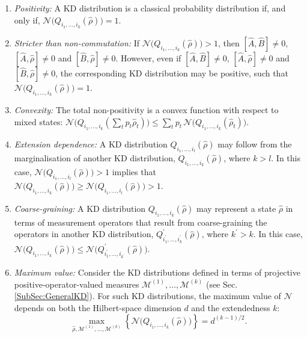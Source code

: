 \documentclass[%
 reprint,
superscriptaddress,
nofootinbib,
bibnotes,
 amsmath,amssymb,
 aps,
]{revtex4-1}
\theoremstyle{plain}
\newcommand{\LParen}{ \bm{(} }
\newcommand{\RParen}{ \bm{)} }
\begin{document}
\begin{enumerate}

\item{ \textit{Positivity:} A KD distribution is a classical probability distribution if, and only if,  $\mathcal{N} \LParen Q_{i_1,\ldots,i_k} (\hat{\rho})  \RParen = 1$.}

\item{ \textit{Stricter than non-commutation:}   If $\mathcal N\LParen Q_{i_1,\ldots,i_k} (\hat{\rho})  \RParen > 1$, then $[\hat{A},\hat{B}] \neq 0$,  $[\hat{A},\hat{\rho}] \neq 0$ and  $[\hat{B},\hat{\rho}] \neq 0$. However, even if $[\hat{A},\hat{B}] \neq 0$,  $[\hat{A},\hat{\rho}] \neq 0$ and  $[\hat{B},\hat{\rho}] \neq 0$, the corresponding KD distribution may be positive, such that $\mathcal N\LParen Q_{i_1,\ldots,i_k} (\hat{\rho})  \RParen = 1$.
}
\item{ \textit{Convexity:} The total non-positivity is a convex function with respect to mixed states: 
$\mathcal{N} \LParen Q_{i_1,\ldots,i_k} \left( \sum_t p_t \hat{\rho}_t \right)  \RParen 
\leq \sum_t p_t \,  \mathcal{N} \LParen Q_{i_1,\ldots,i_k} \left(  \hat{\rho}_t \right)  \RParen $. }

\item{ \textit{Extension dependence:} A KD distribution $Q_{i_1,\ldots,i_l} (\hat{\rho})$ may follow from the marginalisation of another KD distribution, $Q_{i_1,\ldots,i_k} (\hat{\rho})$, where $k>l$. In this case, $\mathcal{N} \LParen Q_{i_1,\ldots,i_l} (\hat{\rho})  \RParen > 1$ implies that  $\mathcal{N} \LParen Q_{i_1,\ldots,i_k} (\hat{\rho})  \RParen \geq \mathcal{N} \LParen Q_{i_1,\ldots,i_l} (\hat{\rho})  \RParen >  1$. }

\item{ \textit{Coarse-graining:} 
A KD distribution $Q_{i_1,\ldots,i_k} (\hat{\rho})$ may 
represent a state $\hat{\rho}$ in terms of measurement operators that result from coarse-graining the operators in another KD distribution, $Q_{i_1^\prime,\ldots,i_k^{\prime}}^{\prime} (\hat{\rho})$, where $k^{\prime} > k$. In this case,  
$\mathcal{N} \LParen Q_{i_1,\ldots,i_k} (\hat{\rho})  \RParen
\leq  \mathcal{N} \LParen Q_{i_1^\prime,\ldots,i_{k^{\prime}}}^{\prime} (\hat{\rho})  \RParen  $.  }

\item{\textit{Maximum value:} Consider 
the KD distributions defined in terms of 
projective positive-operator-valued measures $\mathcal{M}^{(1)}, \ldots, \mathcal{M}^{(k)}$ (see Sec. \ref{SubSec:GeneralKD}).  For such KD distributions, 
the maximum value of $\mathcal{N}$ depends on both the Hilbert-space dimension $d$ and the extendedness $k$:}
\begin{equation}
\label{Eq:MaxKDNeq}
\max_{\hat{\rho},  \mathcal{M}^{(1)}, \ldots, \mathcal{M}^{(k)}} 
\left\{ \mathcal{N} \LParen Q_{i_1,\ldots,i_k} (\hat{\rho})  \RParen \right\} = d^{(k-1)/2} .
\end{equation}

\end{enumerate}
\end{document}
